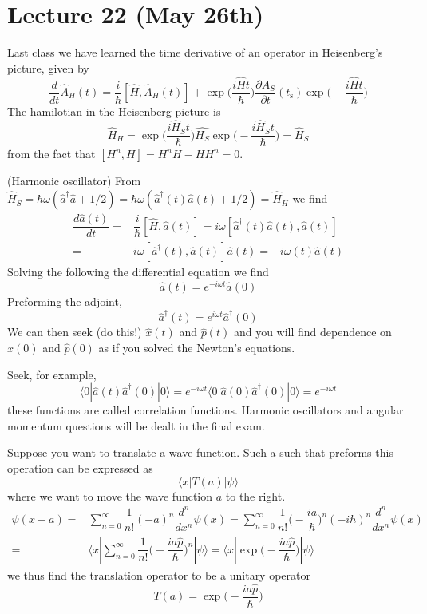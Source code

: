 \section{Lecture 22 (May 26th)}
\begin{rmk}
Last class we have learned the time derivative of an operator in Heisenberg's picture, given by
\[\dfrac{d }{d t}\hat{A}_{H}(t)=\dfrac{i}{\hbar }[\hat{H},\hat{A}_{H}(t)]+\exp\Big(\dfrac{i\hat{H}t}{\hbar }\Big)\dfrac{\partial\hat{A}_{S} }{\partial t}(t_{\mathrm{s}}) \exp \Big(-\dfrac{i\hat{H}t}{\hbar }\Big) \]
The hamilotian in the Heisenberg picture is
\[\hat{H}_{H}=\exp \Big(\dfrac{i\hat{H}_{S}t}{\hbar }\Big)\hat{H_{S}}\exp \Big(-\dfrac{i\hat{H}_{S}t}{\hbar }\Big)=\hat{H}_{S}\]
from the fact that $[H^{n},H]=H^{n}H-HH^{n}=0$. 
\end{rmk}
\vspace{2ex}
\begin{thm}
(Harmonic oscillator) From $\hat{H}_{S}=\hbar \omega (\hat{a}^{\dagger}\hat{a}+1/2)=\hbar \omega (\hat{a}^{\dagger}(t)\hat{a}(t)+1/2)=\hat{H}_{H}$ we find
\begin{align*}
\dfrac{d \hat{a}(t)}{d t}=&\dfrac{i}{\hbar }[\hat{H},\hat{a}(t)]=i\omega [\hat{a}^{\dagger}(t)\hat{a}(t),\hat{a}(t)]\\=&i\omega [\hat{a}^{\dagger}(t),\hat{a}(t)]\hat{a}(t)=-i\omega (t)\hat{a}(t)
\end{align*}
Solving the following the differential equation we find
\[\hat{a}(t)=e^{-i\omega t}\hat{a}(0)\]
Preforming the adjoint,
\[\hat{a}^{\dagger}(t)=e^{i\omega t}\hat{a}^{\dagger}(0)\]
We can then seek (do this!) $\hat{x}(t)$ and $\hat{p}(t)$ and you will find dependence on $\hat{x}(0)$ and $\hat{p}(0)$ as if you solved the Newton's equations.
\end{thm}
\vspace{2ex}
\begin{ex}
Seek, for example,
\[\langle 0|\hat{a}(t)\hat{a}^{\dagger}(0)|0\rangle=e^{-i\omega t}\langle 0|\hat{a}(0)\hat{a}^{\dagger}(0)|0\rangle=e^{-i\omega t}  \]
these functions are called correlation functions. Harmonic oscillators and angular momentum questions will be dealt in the final exam.
\end{ex}
\vspace{2ex}
\begin{prop}
Suppose you want to translate a wave function. Such a such that preforms this operation can be expressed as
\[\langle x|T(a)|\psi \rangle \]
where we want to move the wave function $a$ to the right.
\begin{align*}
\psi (x-a)=&\sum ^{\infty }_{n=0}\dfrac{1}{n!}(-a)^{n}\dfrac{d ^{n}}{d x^{n}}\psi (x)=\sum ^{\infty }_{n=0}\dfrac{1}{n!}\Big(-\dfrac{ia}{\hbar }\Big)^{n}(-i\hbar )^{n}\dfrac{d ^{n}}{d x^{n}}\psi (x)\\=&\langle x|\sum ^{\infty }_{n=0}\dfrac{1}{n!}\Big(-\dfrac{ia\hat{p}}{\hbar }\Big)^{n}|\psi \rangle =\langle x|\exp \Big(-\dfrac{ia\hat{p}}{\hbar }\Big)|\psi \rangle   
\end{align*}
we thus find the translation operator to be a unitary operator
\[T(a)=\exp \Big(-\dfrac{ia\hat{p}}{\hbar }\Big)\]
\end{prop}
